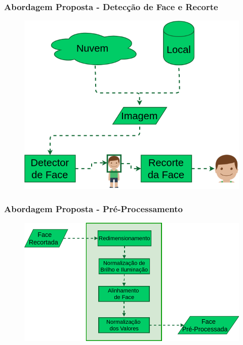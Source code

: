 \documentclass{beamer}
\begin{document}
\begin{frame}
\frametitle{Abordagem Proposta - Detecção de Face e Recorte}
\begin{figure}
\centering
\includegraphics[scale=0.37]{figuras/abordagem_4.png}
\label{fig:arquitetura2}
\end{figure}
\end{frame}

\begin{frame}
\frametitle{Abordagem Proposta - Pré-Processamento}
\begin{figure}
\centering
\includegraphics[scale=0.34]{figuras/abordagem_5.png}
\label{fig:arquitetura3}
\end{figure}
\end{frame}
\end{document}
